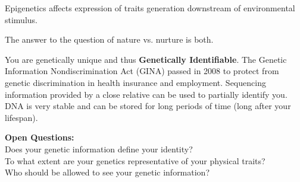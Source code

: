 \documentclass[hyperref,openany, oneside]{labbook} %
\begin{document}
Epigenetics affects expression of traits generation downstream of environmental stimulus. 
\begin{center}
	The answer to the question of nature vs. nurture is both.
\end{center}

\vspace{-0.3cm}
\vspace{-0.2cm}
You are genetically unique and thus \textbf{Genetically Identifiable}. The Genetic Information Nondiscrimination Act (GINA) passed in 2008 to protect from genetic discrimination in health insurance and employment. Sequencing information provided by a close relative can be used to partially identify you. DNA is very stable and can be stored for long periods of time (long after your lifespan).

\textbf{Open Questions:}\\
Does your genetic information define your identity? \\ 
To what extent are your genetics representative of your physical traits? \\
Who should be allowed to see your genetic information?
\end{document}
